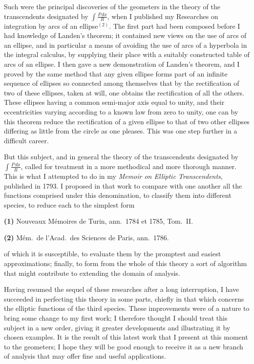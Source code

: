 \documentclass{article}
\begin{document}
Such were the principal discoveries of the geometers in the theory of the transcendents designated by $\displaystyle\int\frac{P\,dx}{R}$, when I published my Researches on integration by arcs of an ellipse${}^{(2)}$. The first part had been composed before I had knowledge of Landen's theorem; it contained new views on the use of arcs of an ellipse, and in particular a means of avoiding the use of arcs of a hyperbola in the integral calculus, by supplying their place with a suitably constructed table of arcs of an ellipse. I then gave a new demonstration of Landen's theorem, and I proved by the same method that any given ellipse forms part of an infinite sequence of ellipses so connected among themselves that by the rectification of two of these ellipses, taken at will, one obtains the rectification of all the others. These ellipses having a common semi-major axis equal to unity, and their eccentricities varying according to a known law from zero to unity, one can by this theorem reduce the rectification of a given ellipse to that of two other ellipses differing as little from the circle as one pleases. This was one step further in a difficult career.

But this subject, and in general the theory of the transcendents designated by $\displaystyle\int\frac{P\,dx}{R}$, called for treatment in a more methodical and more thorough manner. This is what I attempted to do in my \emph{Memoir on Elliptic Transcendents}, published in 1793. I proposed in that work to compare with one another all the functions comprised under this denomination, to classify them into different species, to reduce each to the simplest form

\textbf{(1)} Nouveaux Mémoires de Turin, ann.\ 1784 et 1785, Tom.\ II.

\textbf{(2)} Mém.\ de l'Acad.\ des Sciences de Paris, ann.\ 1786.

of which it is susceptible, to evaluate them by the promptest and easiest approximations; finally, to form from the whole of this theory a sort of algorithm that might contribute to extending the domain of analysis.

Having resumed the sequel of these researches after a long interruption, I have succeeded in perfecting this theory in some parts, chiefly in that which concerns the elliptic functions of the third species. These improvements were of a nature to bring some change to my first work; I therefore thought I should treat this subject in a new order, giving it greater developments and illustrating it by chosen examples. It is the result of this latest work that I present at this moment to the geometers; I hope they will be good enough to receive it as a new branch of analysis that may offer fine and useful applications.
\end{document}
